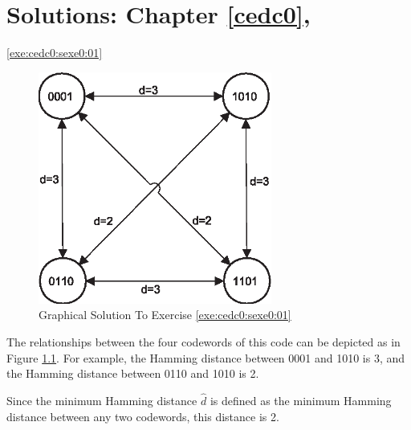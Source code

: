 \chapter[Solutions: Chapter \ref{cedc0}]
        {Solutions: Chapter \ref{cedc0}, \cedczerolongtitle{}}

\label{ceds0}

\vworkexercisechapterheader{}


\begin{vworkexercisesolution}{\ref{exe:cedc0:sexe0:01}}

\begin{figure}
\centering
\includegraphics[height=3.0in]{c_eds0/exe001.eps}
\caption{Graphical Solution To Exercise \ref{exe:cedc0:sexe0:01}}
\label{fig:ceds0:exe01:01}
\end{figure}

The relationships between the four codewords of this code can be
depicted as in Figure \ref{fig:ceds0:exe01:01}.  For example,
the Hamming distance between 0001 and 1010 is 3, and the
Hamming distance between 0110 and 1010 is 2.

Since the minimum Hamming distance $\hat{d}$ is defined as the minimum
Hamming distance between any two codewords, this distance is 2.

\end{vworkexercisesolution}



\vworkexercisechapterfooter


